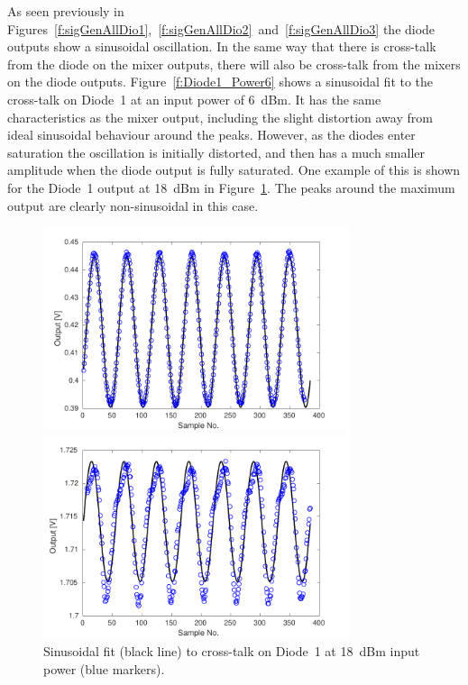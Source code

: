 As seen previously in Figures~\ref{f:sigGenAllDio1},~\ref{f:sigGenAllDio2}~and~\ref{f:sigGenAllDio3} the diode outputs show a sinusoidal oscillation. In the same way that there is cross-talk from the diode on the mixer outputs, there will also be cross-talk from the mixers on the diode outputs. Figure~\ref{f:Diode1_Power6} shows a sinusoidal fit to the cross-talk on Diode~1 at an input power of 6~dBm. It has the same characteristics as the mixer output, including the slight distortion away from ideal sinusoidal behaviour around the peaks. However, as the diodes enter saturation the oscillation is initially distorted, and then has a much smaller amplitude when the diode output is fully saturated. One example of this is shown for the Diode~1 output at 18~dBm in Figure~\ref{f:Diode1_Power18}. The peaks around the maximum output are clearly non-sinusoidal in this case.

\begin{figure}
  \centering
  \includegraphics[width=0.8\textwidth]{Figures/phaseMons/Diode1_Power6}
  \caption{Sinusoidal fit (black line) to cross-talk on Diode~1 at 6~dBm input power (blue markers).}
  \label{f:Diode1_Power6}
  \includegraphics[width=0.8\textwidth]{Figures/phaseMons/Diode1_Power18}
  \caption{Sinusoidal fit (black line) to cross-talk on Diode~1 at 18~dBm input power (blue markers).}
  \label{f:Diode1_Power18}
\end{figure}


